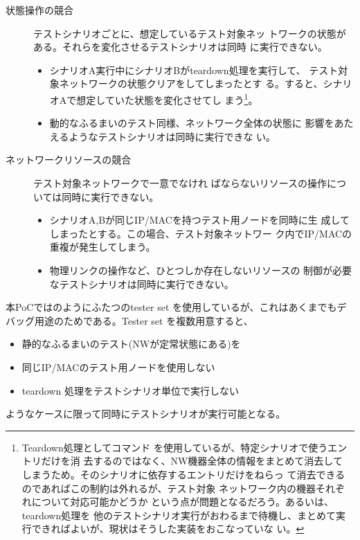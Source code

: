 \begin{description}
 \item[状態操作の競合] テストシナリオごとに、想定しているテスト対象ネッ
            トワークの状態がある。それらを変化させるテストシナリオは同時
            に実行できない。
            \begin{itemize}
             \item シナリオA実行中にシナリオBがteardown処理を実行して、
                   テスト対象ネットワークの状態クリアをしてしまったとす
                   る。すると、シナリオAで想定していた状態を変化させてし
                   まう\footnote{Teardown処理としてコマンド
                   を使用しているが、特定シナリオで使うエントリだけを消
                   去するのではなく、NW機器全体の情報をまとめて消去して
                   しまうため。そのシナリオに依存するエントリだけをねらっ
                   て消去できるのであればこの制約は外れるが、テスト対象
                   ネットワーク内の機器それぞれについて対応可能かどうか
                   という点が問題となるだろう。あるいは、teardown処理を
                   他のテストシナリオ実行がおわるまで待機し、まとめて実
                   行できればよいが、現状はそうした実装をおこなっていな
                   い。}。
             \item 動的なふるまいのテスト同様、ネットワーク全体の状態に
                   影響をあたえるようなテストシナリオは同時に実行できな
                   い。
            \end{itemize}
 \item[ネットワークリソースの競合] テスト対象ネットワークで一意でなけれ
            ばならないリソースの操作については同時に実行できない。
            \begin{itemize}
             \item シナリオA,Bが同じIP/MACを持つテスト用ノードを同時に生
                   成してしまったとする。この場合、テスト対象ネットワー
                   ク内でIP/MACの重複が発生してしまう。
             \item 物理リンクの操作など、ひとつしか存在しないリソースの
                   制御が必要なテストシナリオは同時に実行できない。
            \end{itemize}
\end{description}

本PoCではのようにふたつのtester set
を使用しているが、これはあくまでもデバッグ用途のためである。Tester set
を複数用意すると、
\begin{itemize}
 \item 静的なふるまいのテスト(NWが定常状態にある)を
 \item 同じIP/MACのテスト用ノードを使用しない
 \item teardown 処理をテストシナリオ単位で実行しない
\end{itemize}
ようなケースに限って同時にテストシナリオが実行可能となる。

